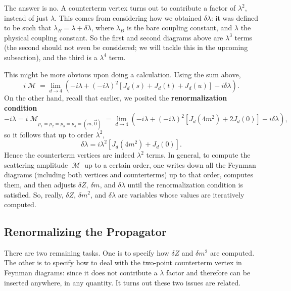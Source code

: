 \documentclass{report}
\theoremstyle{plain}
\theoremstyle{definition}
\theoremstyle{remark}
\DeclareMathOperator{\cM}{\mathcal{M}}
\begin{document}
The answer is no. A counterterm vertex turns out to contribute a
factor of $\lambda^2$, instead of just $\lambda$. This comes from
considering how we obtained $\delta \lambda$: it was defined to be
such that $\lambda_B = \lambda + \delta \lambda$, where $\lambda_B$ is
the bare coupling constant, and $\lambda$ the physical coupling
constant. So the first and second diagrams above are $\lambda^3$ terms
(the second should not even be considered; we will tackle this in the
upcoming subsection), and the third is a $\lambda^4$ term.

This might be more obvious upon doing a calculation. Using the sum
above,
$$ i\cM = \lim_{d \to 4} (-i\lambda + (-i\lambda)^2[J_d(s) + J_d(t) + J_d(u)] - i\delta\lambda). $$
On the other hand, recall that earlier, we posited the {\bf
  renormalization condition}
$$ -i\lambda = i\cM_{p_1=p_2=p_3=p_4=(m,\vec{0})} = \lim_{d \to 4} (-i\lambda + (-i\lambda)^2[J_d(4m^2) + 2J_d(0)] - i\delta\lambda), $$
so it follows that up to order $\lambda^2$,
$$ \delta\lambda = i\lambda^2[J_d(4m^2) + J_d(0)]. $$
Hence the counterterm vertices are indeed $\lambda^2$ terms. In
general, to compute the scattering amplitude $\cM$ up to a certain
order, one writes down all the Feynman diagrams (including both
vertices and counterterms) up to that order, computes them, and then
adjusts $\delta Z$, $\delta m$, and $\delta\lambda$ until the
renormalization condition is satisfied. So, really, $\delta Z$,
$\delta m^2$, and $\delta\lambda$ are variables whose values are
iteratively computed.

\subsection{Renormalizing the Propagator}

There are two remaining tasks. One is to specify how $\delta Z$ and
$\delta m^2$ are computed. The other is to specify how to deal with
the two-point counterterm vertex in Feynman diagrams: since it does
not contribute a $\lambda$ factor and therefore can be inserted
anywhere, in any quantity. It turns out these two issues are related.
\end{document}
